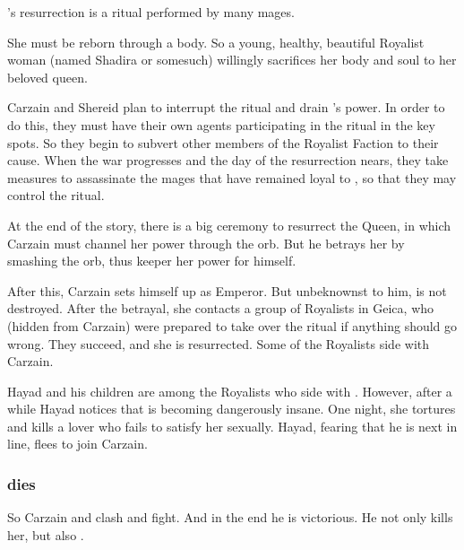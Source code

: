 \begin{garbage}

\Belzir's resurrection is a ritual performed by many mages. 

She must be reborn through a \human{} body. 
So a young, healthy, beautiful Royalist woman (named Shadira or somesuch) willingly sacrifices her body and soul to her beloved queen. 

Carzain and Shereid plan to interrupt the ritual and drain \Belzir's power. 
In order to do this, they must have their own agents participating in the ritual in the key spots. 
So they begin to subvert other members of the Royalist Faction to their cause. 
When the war progresses and the day of the resurrection nears, they take measures to assassinate the mages that have remained loyal to \Belzir, so that they may control the ritual. 

At the end of the story, there is a big ceremony to resurrect the Queen, in which Carzain must channel her power through the orb. 
But he betrays her by smashing the orb, thus keeper her power for himself. 

After this, Carzain sets himself up as Emperor. 
But unbeknownst to him, \Belzir{} is not destroyed. 
After the betrayal, she contacts a group of Royalists in Geica, who (hidden from Carzain) were prepared to take over the ritual if anything should go wrong. 
They succeed, and she is resurrected. Some of the Royalists side with Carzain. 

Hayad and his children are among the Royalists who side with \Belzir. However, after a while Hayad notices that \Belzir{} is becoming dangerously insane. 
One night, she tortures and kills a lover who fails to satisfy her sexually. 
Hayad, fearing that he is next in line, flees to join Carzain. 





\subsubsection{\Shiaraid{} dies}
So Carzain and \Belzir{} clash and fight.
And in the end he is victorious. 
He not only kills her, but also . 


\end{garbage}
